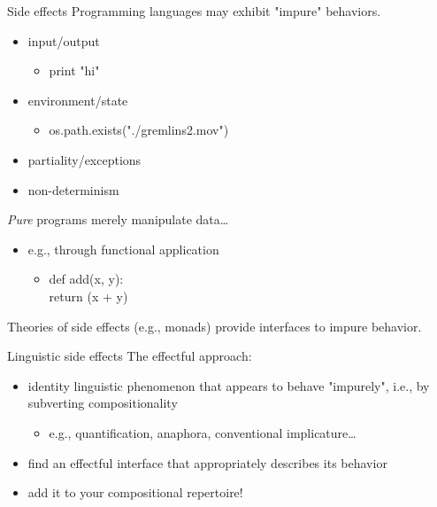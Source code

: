 \documentclass[presentation]{beamer}
\begin{document}
\begin{frame}[label={sec:org3203b1d}]{Side effects}
Programming languages may exhibit "impure" behaviors.
\pause
\begin{itemize}[<+->]
\item input/output
\begin{itemize}
\item print "hi"
\end{itemize}
\item environment/state
\begin{itemize}
\item os.path.exists("./gremlins2.mov")
\end{itemize}
\item partiality/exceptions
\item non-determinism
\end{itemize}

\pause
\emph{Pure} programs merely manipulate data\ldots
\pause
\begin{itemize}
\item e.g., through functional application
\begin{itemize}
\item def add(x, y):\\
\hspace{5mm}return (x + y)
\end{itemize}
\end{itemize}

\bigskip

\pause
\alert{Theories of side effects (e.g., monads) provide interfaces to impure behavior.} 
\end{frame}

\begin{frame}[label={sec:orgf911628}]{Linguistic side effects}
The effectful approach:
\pause
\begin{itemize}[<+->]
\item identity linguistic phenomenon that appears to behave "impurely", i.e., by subverting compositionality
\begin{itemize}
\item e.g., quantification, anaphora, conventional implicature\ldots
\end{itemize}
\item find an effectful interface that appropriately describes its behavior
\item add it to your compositional repertoire!
\end{itemize}
\end{frame}
\end{document}
